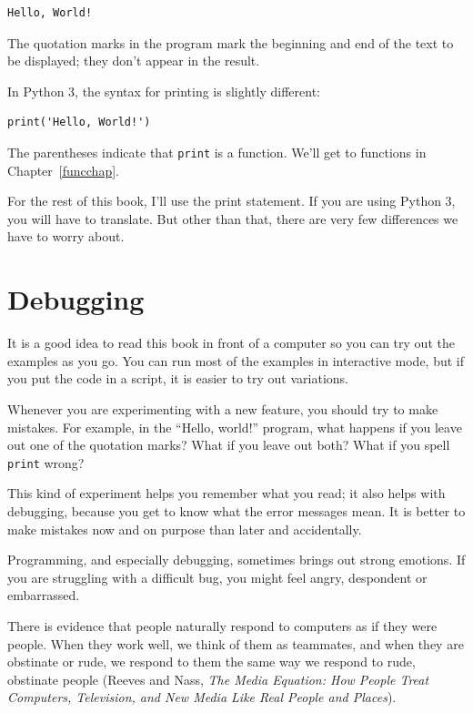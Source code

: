 \documentclass[10pt]{book}
\begin{document}
\begin{verbatim}
Hello, World!
\end{verbatim}
%
The quotation marks in the program mark the beginning and end
of the text to be displayed; they don't appear in the result.

In Python 3, the syntax for printing is slightly different:

\begin{verbatim}
print('Hello, World!')
\end{verbatim}
%
The parentheses indicate that {\tt print} is a function.  We'll get
to functions in Chapter~\ref{funcchap}.
  

For the rest of this book, I'll use the print statement.  If you
are using Python 3, you will have to translate.  But other than
that, there are very few differences we have to worry about.


\section{Debugging}

It is a good idea to read this book in front of a computer so you can
try out the examples as you go.  You can run most of the examples in
interactive mode, but if you put the code in a script, it is easier
to try out variations.

Whenever you are experimenting with a new feature, you should try
to make mistakes.  For example, in the ``Hello, world!'' program,
what happens if you leave out one of the quotation marks?  What
if you leave out both?  What if you spell {\tt print} wrong?

This kind of experiment helps you remember what you read; it also helps
with debugging, because you get to know what the error messages mean.
It is better to make mistakes now and on purpose than later
and accidentally.

Programming, and especially debugging, sometimes brings out strong
emotions.  If you are struggling with a difficult bug, you might 
feel angry, despondent or embarrassed.

There is evidence that people naturally respond to computers as if
they were people.  When they work well, we think
of them as teammates, and when they are obstinate or rude, we
respond to them the same way we respond to rude,
obstinate people (Reeves and Nass, {\it The Media
    Equation: How People Treat Computers, Television, and New Media
    Like Real People and Places}).
\end{document}
